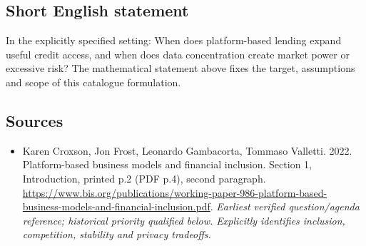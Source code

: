 \documentclass[11pt]{article}
\begin{document}
\subsection{Short English statement}
In the explicitly specified setting: When does platform-based lending expand useful credit access, and when does data concentration create market power or excessive risk? The mathematical statement above fixes the target, assumptions and scope of this catalogue formulation.

\subsection{Sources}
\begin{itemize}\raggedright
\item[\textnormal{[S1]}]\hypertarget{source:30007610:1}{} Karen Croxson, Jon Frost, Leonardo Gambacorta, Tommaso Valletti. 2022. Platform-based business models and financial inclusion. Section 1, Introduction, printed p.2 (PDF p.4), second paragraph.
\url{https://www.bis.org/publications/working-paper-986-platform-based-business-models-and-financial-inclusion.pdf}.
{\small\textit{Earliest verified question/agenda reference; historical priority qualified below. Explicitly identifies inclusion, competition, stability and privacy tradeoffs.}}
\end{itemize}
\end{document}
